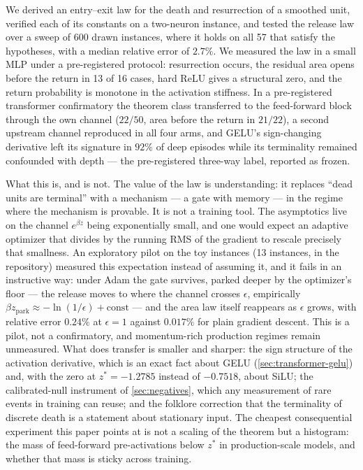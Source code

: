 \documentclass[11pt]{article}
\theoremstyle{definition}
\theoremstyle{remark}
\begin{document}
We derived an entry--exit law for the death and resurrection of a smoothed unit,
verified each of its constants on a two-neuron instance, and tested the release
law over a sweep of 600 drawn instances, where it holds on all 57 that satisfy
the hypotheses, with a median relative error of $2.7\%$. We measured the law
in a small MLP under a pre-registered protocol: resurrection occurs, the residual
area opens before the return in 13 of 16 cases, hard ReLU gives a structural
zero, and the return probability is monotone in the activation stiffness. In a
pre-registered transformer confirmatory the theorem class transferred to
the feed-forward block through the own channel ($22/50$, area before the return
in $21/22$), a second upstream channel reproduced in all four arms, and GELU's
sign-changing derivative left its signature in $92\%$ of deep episodes while its
terminality remained confounded with depth --- the pre-registered three-way
label, reported as frozen.

What this is, and is not. The value of the law is understanding: it replaces
``dead units are terminal'' with a mechanism --- a gate with memory --- in the
regime where the mechanism is provable. It is not a training tool. The
asymptotics live on the channel $e^{\beta z}$ being exponentially small, and one
would expect an adaptive optimizer that divides by the running RMS of the
gradient to rescale precisely that smallness. An exploratory pilot on the toy
instances (13 instances,  in the repository) measured
this expectation instead of assuming it, and it fails in an instructive way:
under Adam the gate survives, parked deeper by the optimizer's floor --- the
release moves to where the channel crosses $\epsilon$, empirically
$\beta z_{\mathrm{park}}\approx-\ln(1/\epsilon)+\mathrm{const}$ --- and the
area law itself reappears as $\epsilon$ grows, with relative error $0.24\%$ at
$\epsilon=1$ against $0.017\%$ for plain gradient descent. This is a pilot,
not a confirmatory, and momentum-rich production regimes remain unmeasured. What does
transfer is smaller and sharper: the sign structure of the activation
derivative, which is an exact fact about GELU (\cref{sec:transformer-gelu})
and, with the zero at $z^\ast=-1.2785$ instead of $-0.7518$, about SiLU; the
calibrated-null instrument of \cref{sec:negatives}, which any measurement of
rare events in training can reuse; and the folklore correction that the
terminality of discrete death is a statement about stationary input. The
cheapest consequential experiment this paper points at is not a scaling of the
theorem but a histogram: the mass of feed-forward pre-activations below
$z^\ast$ in production-scale models, and whether that mass is sticky across
training.
\end{document}
